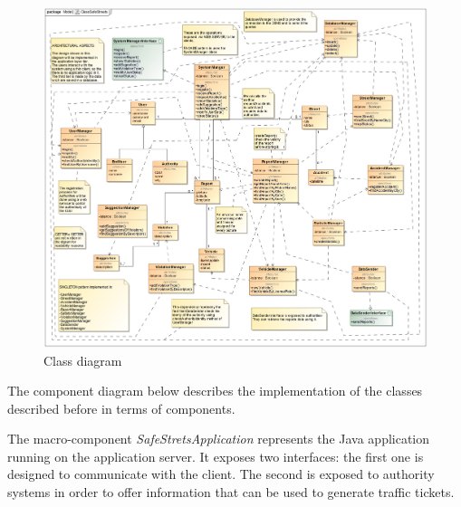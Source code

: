 \begin{figure}[H]
	\centering
	\includegraphics[width=1.12\linewidth]{Images/ClassSafeStreets.png}
	\caption{Class diagram}
\end{figure}

\newpage

The component diagram below describes the implementation of the classes described before in terms of components.

The macro-component \textit{SafeStretsApplication} represents the Java application running on the application server. It exposes two interfaces: the first one is designed to communicate with the client. The second is exposed to authority systems in order to offer information that can be used to generate traffic tickets.

